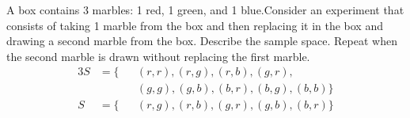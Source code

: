 \item
A box contains 3 marbles: 1 red, 1 green, and 1 blue.Consider an experiment that consists of taking 1 marble from the box and then replacing it in the box and drawing a second marble from the box. Describe the sample space. Repeat when the second marble is drawn without replacing the first marble.
\begin{alignat*}{3}
    S &= \{
    &&{(r, r)},
    {(r, g)},
    {(r, b)},
    {(g, r)},\\
    &&&{(g, g)},
    {(g, b)},
    {(b, r)},
    {(b, g)},
    {(b, b)}
    \}\\
    S &= \{
    &&{(r, g)},
    {(r, b)},
    {(g, r)},
    {(g, b)},
    {(b, r)}
    \}
\end{alignat*}